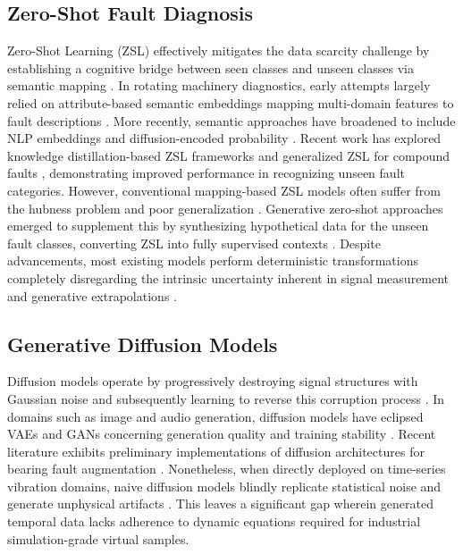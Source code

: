 \subsection{Zero-Shot Fault Diagnosis}
Zero-Shot Learning (ZSL) effectively mitigates the data scarcity challenge by establishing a cognitive bridge between seen classes and unseen classes via semantic mapping \cite{xian2018zero}. In rotating machinery diagnostics, early attempts largely relied on attribute-based semantic embeddings mapping multi-domain features to fault descriptions \cite{zhang2023zero}. More recently, semantic approaches have broadened to include NLP embeddings and diffusion-encoded probability \cite{chen2024semantic}. Recent work has explored knowledge distillation-based ZSL frameworks \cite{liu2025knowledge} and generalized ZSL for compound faults \cite{song2025generalized}, demonstrating improved performance in recognizing unseen fault categories. However, conventional mapping-based ZSL models often suffer from the hubness problem and poor generalization \cite{xian2018zero}. Generative zero-shot approaches emerged to supplement this by synthesizing hypothetical data for the unseen fault classes, converting ZSL into fully supervised contexts \cite{schonfeld2019cada,kingma2013auto}. Despite advancements, most existing models perform deterministic transformations completely disregarding the intrinsic uncertainty inherent in signal measurement and generative extrapolations \cite{gal2016dropout}.

\subsection{Generative Diffusion Models}
Diffusion models operate by progressively destroying signal structures with Gaussian noise and subsequently learning to reverse this corruption process \cite{ho2020denoising}. In domains such as image and audio generation, diffusion models have eclipsed VAEs and GANs concerning generation quality and training stability \cite{song2020score,goodfellow2014generative}. Recent literature exhibits preliminary implementations of diffusion architectures for bearing fault augmentation \cite{ho2020denoising}. Nonetheless, when directly deployed on time-series vibration domains, naive diffusion models blindly replicate statistical noise and generate unphysical artifacts \cite{song2020score}. This leaves a significant gap wherein generated temporal data lacks adherence to dynamic equations required for industrial simulation-grade virtual samples.

